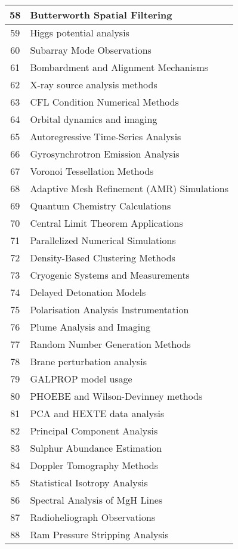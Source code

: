 \begin{table}[htbp]
\begin{tabular}{|c|l|}
\hline
58 & Butterworth Spatial Filtering \\
\hline
59 & Higgs potential analysis \\
\hline
60 & Subarray Mode Observations \\
\hline
61 & Bombardment and Alignment Mechanisms \\
\hline
62 & X-ray source analysis methods \\
\hline
63 & CFL Condition Numerical Methods \\
\hline
64 & Orbital dynamics and imaging \\
\hline
65 & Autoregressive Time-Series Analysis \\
\hline
66 & Gyrosynchrotron Emission Analysis \\
\hline
67 & Voronoi Tessellation Methods \\
\hline
68 & Adaptive Mesh Refinement (AMR) Simulations \\
\hline
69 & Quantum Chemistry Calculations \\
\hline
70 & Central Limit Theorem Applications \\
\hline
71 & Parallelized Numerical Simulations \\
\hline
72 & Density-Based Clustering Methods \\
\hline
73 & Cryogenic Systems and Measurements \\
\hline
74 & Delayed Detonation Models \\
\hline
75 & Polarisation Analysis Instrumentation \\
\hline
76 & Plume Analysis and Imaging \\
\hline
77 & Random Number Generation Methods \\
\hline
78 & Brane perturbation analysis \\
\hline
79 & GALPROP model usage \\
\hline
80 & PHOEBE and Wilson-Devinney methods \\
\hline
81 & PCA and HEXTE data analysis \\
\hline
82 & Principal Component Analysis \\
\hline
83 & Sulphur Abundance Estimation \\
\hline
84 & Doppler Tomography Methods \\
\hline
85 & Statistical Isotropy Analysis \\
\hline
86 & Spectral Analysis of MgH Lines \\
\hline
87 & Radioheliograph Observations \\
\hline
88 & Ram Pressure Stripping Analysis \\

\end{tabular}
\end{table}
